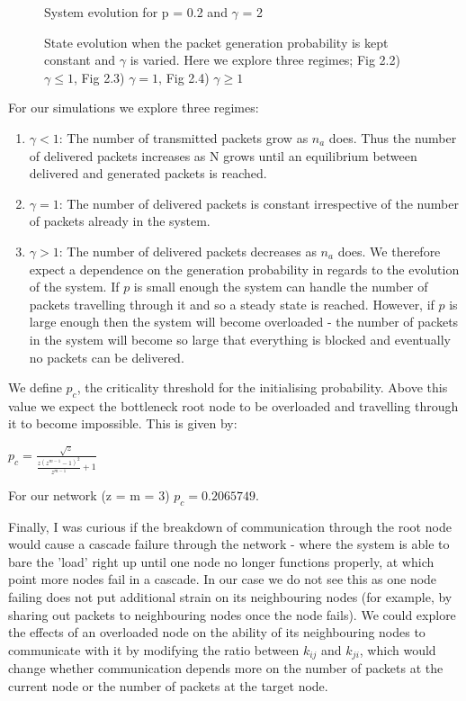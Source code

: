 \begin{figure}[H]
\begin{minipage}[t]{0.45\textwidth}
    \caption{System evolution for p = 0.2 and $\gamma$ = 2}
    \label{fig:image3}
  \end{minipage}
\caption{State evolution when the packet generation probability is kept constant and $\gamma$ is varied. Here we explore three regimes; Fig 2.2) $\gamma \leq 1$, Fig 2.3) $\gamma = 1$, Fig 2.4) $\gamma \geq 1$}
\end{figure}

For our simulations we explore three regimes:
\begin{enumerate}
    \item $\gamma < 1$: The number of transmitted packets grow as $n_a$ does. Thus the number of delivered packets increases as N grows until an equilibrium between delivered and generated packets is reached.
    \item $\gamma = 1$:  The number of delivered packets is constant irrespective of the number of packets already in the system.
    \item $\gamma > 1$: The number of delivered packets decreases as $n_a$ does. We therefore expect a dependence on the generation probability in regards to the evolution of the system. If $p$ is small enough the system can handle the number of packets travelling through it and so a steady state is reached. However, if $p$ is large enough then the system will become overloaded - the number of packets in the system will become so large that everything is blocked and eventually no packets can be delivered.
\end{enumerate}

We define $p_c$, the criticality threshold for the initialising probability. Above this value we expect the bottleneck root node to be overloaded and travelling through it to become impossible. This is given by:

$p_c = \frac{\sqrt{z}}{\frac{z(z^{m-1} - 1)^2}{z^{m-1}} + 1}$

For our network (z = m = 3) $p_c = 0.2065749$.

Finally, I was curious if the breakdown of communication through the root node would cause a cascade failure through the network - where the system is able to bare the 'load' right up until one node no longer functions properly, at which point more nodes fail in a cascade. In our case we do not see this as one node failing does not put additional strain on its neighbouring nodes (for example, by sharing out packets to neighbouring nodes once the node fails). We could explore the effects of an overloaded node on the ability of its neighbouring nodes to communicate with it by modifying the ratio between $k_{ij}$ and $k_{ji}$, which would change whether communication depends more on the number of packets at the current node or the number of packets at the target node.

\newpage